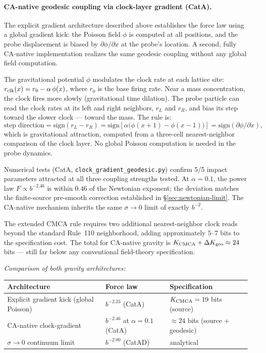 \documentclass[11pt]{article}
\theoremstyle{remark}
\begin{document}
\paragraph{CA-native geodesic coupling via clock-layer gradient (CatA).}
\label{sec:ca-native-gravity}%
The explicit gradient architecture described above establishes the force law using a global gradient kick:
the Poisson field $\phi$ is computed at all positions, and the probe displacement is
biased by $\partial\phi/\partial x$ at the probe's location. A second, fully CA-native
implementation realizes the same geodesic coupling without any global field computation.

The gravitational potential $\phi$ modulates the clock rate at each lattice site:
$r_{\rm clk}(x) = r_0 - \alpha\,\phi(x)$, where $r_0$ is the base firing rate.
Near a mass concentration, the clock fires more slowly (gravitational time dilation).
The probe particle can read the clock rates at its left and right neighbors, $r_L$ and
$r_R$, and bias its step toward the slower clock --- toward the mass. The rule is:
\begin{equation}
  \text{step direction} = \mathrm{sign}(r_L - r_R)
  = \mathrm{sign}\!\left[\alpha\bigl(\phi(x{+}1)-\phi(x{-}1)\bigr)\right]
  = \mathrm{sign}\!\left(\partial\phi/\partial x\right),
\end{equation}
which is gravitational attraction, computed from a three-cell nearest-neighbor
comparison of the clock layer. No global Poisson computation is needed in the
probe dynamics.

Numerical tests (CatA, \texttt{clock\_gradient\_geodesic.py}) confirm 5/5 impact
parameters attracted at all three coupling strengths tested. At $\alpha=0.1$, the
power law $F\propto b^{-2.46}$ is within $0.46$ of the Newtonian exponent; the
deviation matches the finite-source pre-smooth correction established in
\S\ref{sec:newtonian-limit}. The CA-native mechanism inherits the same
$\sigma\to 0$ limit of exactly $b^{-2}$.

The extended CMCA rule requires two additional nearest-neighbor clock reads beyond
the standard Rule~110 neighborhood, adding approximately $5$--$7$ bits to the
specification cost. The total for CA-native gravity is $K_{\rm CMCA} + \Delta K_{\rm geo}
\approx 24$ bits --- still far below any conventional field-theory specification.

\medskip
\noindent\textit{Comparison of both gravity architectures:}
\begin{center}
\small
\begin{tabular}{lll}
\toprule
Architecture & Force law & Specification\\
\midrule
Explicit gradient kick (global Poisson) & $b^{-2.23}$ (CatA) & $K_{\rm CMCA}=19$ bits (source)\\
CA-native clock-gradient & $b^{-2.46}$ at $\alpha=0.1$ (CatA) & $\approx 24$ bits (source + geodesic)\\
$\sigma\to 0$ continuum limit & $b^{-2.00}$ (CatAD) & analytical\\
\bottomrule
\end{tabular}
\end{center}
\end{document}
